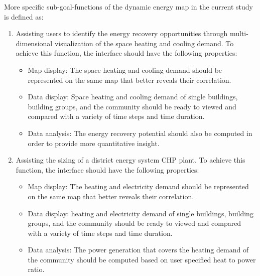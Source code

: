 More specific sub-goal-functions of the dynamic energy map in the
current study is defined as:
\begin{enumerate}[{Function }1.]
  
\item Assisting users to identify the energy recovery opportunities
  through multi-dimensional visualization of the space heating and
  cooling demand. To achieve this function, the interface should have
  the following properties:
  \begin{itemize}
  \item Map display: The space heating and cooling demand should
    be represented on the same map that better reveals their
    correlation.
  \item Data display: Space heating and cooling demand of single
    buildings, building groups, and the community should be ready to
    viewed and compared with a variety of time steps and time
    duration.
  \item Data analysis: The energy recovery potential should also be
    computed in order to provide more quantitative insight.
  \end{itemize}

\item Assisting the sizing of a district energy system CHP plant. To
  achieve this function, the interface should have the following
  properties:
  \begin{itemize}
  \item Map display: The heating and electricity demand should
    be represented on the same map that better reveals their
    correlation.
  \item Data display: heating and electricity demand of single
    buildings, building groups, and the community should be ready to
    viewed and compared with a variety of time steps and time
    duration.
  \item Data analysis: The power generation that covers the heating
    demand of the community should be computed based on user specified
    heat to power ratio.
  \end{itemize}
\end{enumerate}